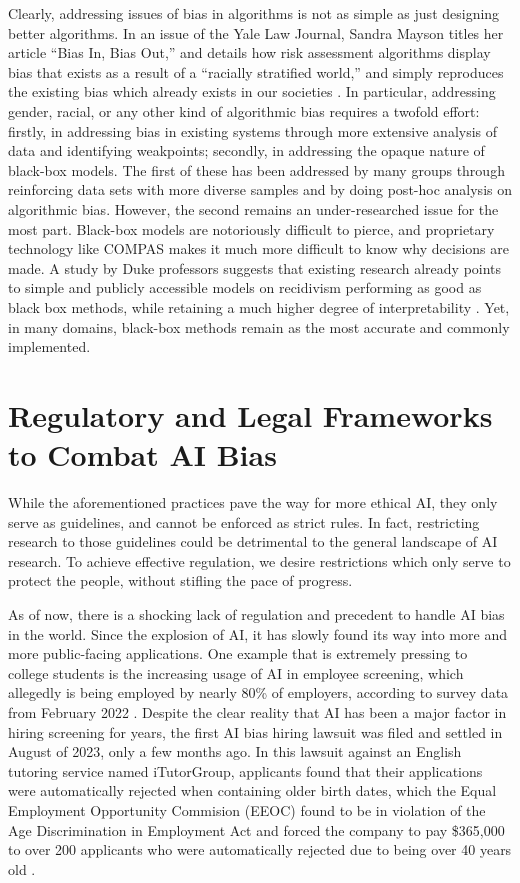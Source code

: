 \documentclass[10pt]{article}
\begin{document}
  Clearly, addressing issues of bias in algorithms is not as simple as just designing better algorithms. In an issue of the Yale Law Journal, Sandra Mayson titles her article “Bias In, Bias Out,” and details how risk assessment algorithms display bias that exists as a result of a “racially stratified world,” and simply reproduces the existing bias which already exists in our societies \cite{mayson2019bias}. In particular, addressing gender, racial, or any other kind of algorithmic bias requires a twofold effort: firstly, in addressing bias in existing systems through more extensive analysis of data and identifying weakpoints; secondly, in addressing the opaque nature of black-box models. The first of these has been addressed by many groups through reinforcing data sets with more diverse samples and by doing post-hoc analysis on algorithmic bias. However, the second remains an under-researched issue for the most part. Black-box models are notoriously difficult to pierce, and proprietary technology like COMPAS makes it much more difficult to know why decisions are made. A study by Duke professors suggests that existing research already points to simple and publicly accessible models on recidivism performing as good as black box methods, while retaining a much higher degree of interpretability \cite{rudin2018age}. Yet, in many domains, black-box methods remain as the most accurate and commonly implemented. 

\section{Regulatory and Legal Frameworks to Combat AI Bias}

  While the aforementioned practices pave the way for more ethical AI, they only serve as guidelines, and cannot be enforced as strict rules. In fact, restricting research to those guidelines could be detrimental to the general landscape of AI research. To achieve effective regulation, we desire restrictions which only serve to protect the people, without stifling the pace of progress.

  As of now, there is a shocking lack of regulation and precedent to handle AI bias in the world. Since the explosion of AI, it has slowly found its way into more and more public-facing applications. One example that is extremely pressing to college students is the increasing usage of AI in employee screening, which allegedly is being employed by nearly 80\% of employers, according to survey data from February 2022 \cite{gilbert2023eeoc}. Despite the clear reality that AI has been a major factor in hiring screening for years, the first AI bias hiring lawsuit was filed and settled in August of 2023, only a few months ago. In this lawsuit against an English tutoring service named iTutorGroup, applicants found that their applications were automatically rejected when containing older birth dates, which the Equal Employment Opportunity Commision (EEOC) found to be in violation of the Age Discrimination in Employment Act and forced the company to pay \$365,000 to over 200 applicants who were automatically rejected due to being over 40 years old \cite{gilbert2023eeoc}.
\end{document}
